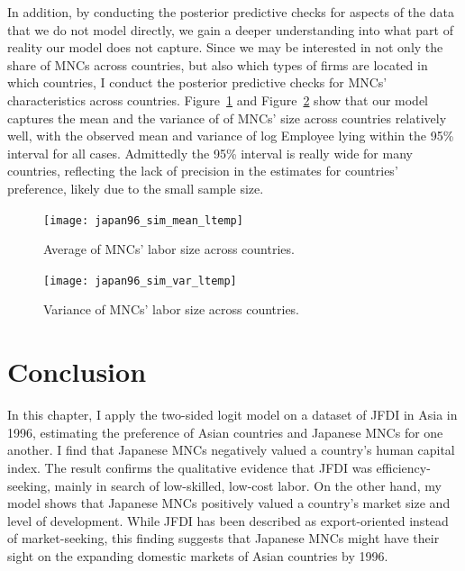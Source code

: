 In addition, by conducting the posterior predictive checks for aspects of the
data that we do not model directly, we gain a deeper understanding into what
part of reality our model does not capture. Since we may be interested in
not only the share of MNCs across countries, but also which types of firms are
located in which countries, I conduct the posterior predictive checks for MNCs'
characteristics across countries. Figure~\ref{fig:japan96_sim_mean_ltemp} and
Figure~\ref{fig:japan96_sim_var_ltemp} show that our model captures the mean
and the variance of of MNCs' size across countries relatively well, with the
observed mean and variance of log Employee lying within the 95\% interval for all cases.
Admittedly the 95\% interval is really wide for many countries, reflecting the
lack of precision in the estimates for countries' preference, likely due to the
small sample size.

\begin{figure}[!ht] \centering
\texttt{[image: japan96\_sim\_mean\_ltemp]}
  \caption[Predicted and observed MNCs' size across countries.]{Average of MNCs' labor size across countries.}
  \label{fig:japan96_sim_mean_ltemp}
\end{figure}

\begin{figure}[!ht] \centering
\texttt{[image: japan96\_sim\_var\_ltemp]}
  \caption[Predicted and observed variance of MNCs' size across countries.]{Variance of MNCs' labor size across countries.}
  \label{fig:japan96_sim_var_ltemp}
\end{figure}

\section{Conclusion}

In this chapter, I apply the two-sided logit model on a dataset of JFDI in Asia
in 1996, estimating the preference of Asian countries and Japanese MNCs for one
another. I find that Japanese MNCs negatively valued a country's human capital
index. The result confirms the qualitative evidence that JFDI was
efficiency-seeking, mainly in search of low-skilled, low-cost labor. On the
other hand, my model shows that Japanese MNCs positively valued a country's
market size and level of development. While JFDI has been described as
export-oriented instead of market-seeking, this finding suggests that Japanese
MNCs might have their sight on the expanding domestic markets of Asian countries
by 1996.

